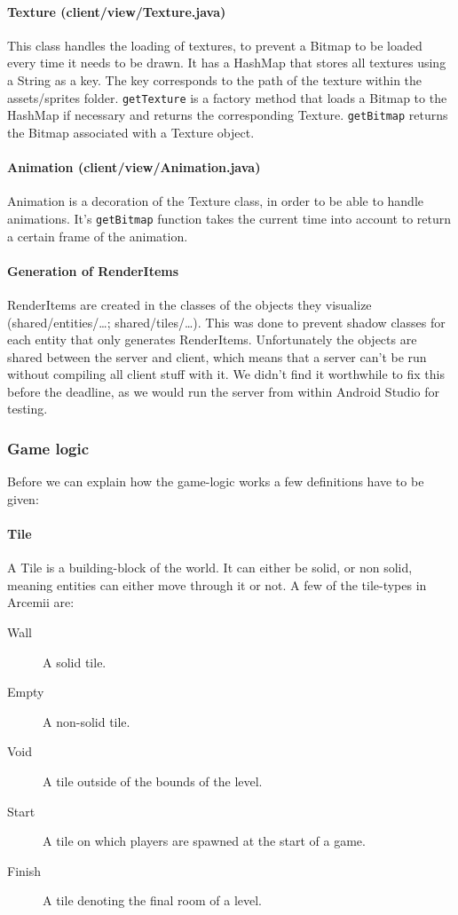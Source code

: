 \documentclass[../main.tex]{subfiles}
\begin{document}
        \paragraph{Texture (\tiny client/view/Texture.java\normalsize)} This class handles the loading of textures, to prevent a Bitmap to be loaded every time it needs to be drawn. It has a HashMap that stores all textures using a String as a key. The key corresponds to the path of the texture within the assets/sprites folder. \texttt{getTexture} is a factory method that loads a Bitmap to the HashMap if necessary and returns the corresponding Texture. \texttt{getBitmap} returns the Bitmap associated with a Texture object.

        \paragraph{Animation (\tiny client/view/Animation.java\normalsize)} Animation is a decoration of the Texture class, in order to be able to handle animations. It's \texttt{getBitmap} function takes the current time into account to return a certain frame of the animation.

        \paragraph{Generation of RenderItems} RenderItems are created in the classes of the objects they visualize (\tiny shared/entities/\dots; shared/tiles/\dots\normalsize). This was done to prevent shadow classes for each entity that only generates RenderItems. Unfortunately the objects are shared between the server and client, which means that a server can't be run without compiling all client stuff with it. We didn't find it worthwhile to fix this before the deadline, as we would run the server from within Android Studio for testing. 

        
        \subsubsection{Game logic}\label{sec: game logic}
        Before we can explain how the game-logic works a few definitions have to be given:

        \paragraph{Tile} A Tile is a building-block of the world. It can either be solid, or non solid, meaning entities can either move through it or not. A few of the tile-types in Arcemii are:
        \begin{description}
            \item[Wall] A solid tile.
            \item[Empty] A non-solid tile.
            \item[Void] A tile outside of the bounds of the level.
            \item[Start] A tile on which players are spawned at the start of a game.
            \item[Finish] A tile denoting the final room of a level.
        \end{description}
\end{document}
